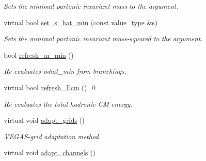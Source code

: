 \begin{DoxyCompactItemize}
\begin{DoxyCompactList}\small\item\em Sets the minimal partonic invariant mass to the argument. \end{DoxyCompactList}\item 
\hypertarget{a00308_a267936bf3ad30578dd484ed9f6330edc}{}virtual bool \hyperlink{a00308_a267936bf3ad30578dd484ed9f6330edc}{set\+\_\+s\+\_\+hat\+\_\+min} (const value\+\_\+type \&\hyperlink{a00308_ae2984255cbdaabc293b8168d93c767bf}{s})\label{a00308_a267936bf3ad30578dd484ed9f6330edc}

\begin{DoxyCompactList}\small\item\em Sets the minimal partonic invariant mass-\/squared to the argument. \end{DoxyCompactList}\item 
\hypertarget{a00308_a2b22b0c269c6f0e27fe6102276de1427}{}bool \hyperlink{a00308_a2b22b0c269c6f0e27fe6102276de1427}{refresh\+\_\+m\+\_\+min} ()\label{a00308_a2b22b0c269c6f0e27fe6102276de1427}

\begin{DoxyCompactList}\small\item\em Re-\/evaluates mhat\+\_\+min from branchings. \end{DoxyCompactList}\item 
\hypertarget{a00308_af24282fe342f982ca26a28d2496cb653}{}virtual bool \hyperlink{a00308_af24282fe342f982ca26a28d2496cb653}{refresh\+\_\+\+Ecm} ()=0\label{a00308_af24282fe342f982ca26a28d2496cb653}

\begin{DoxyCompactList}\small\item\em Re-\/evaluates the total hadronic C\+M-\/energy. \end{DoxyCompactList}\item 
\hypertarget{a00308_ac172aa22fc7caedb79a7cb377bef3031}{}virtual void \hyperlink{a00308_ac172aa22fc7caedb79a7cb377bef3031}{adapt\+\_\+grids} ()\label{a00308_ac172aa22fc7caedb79a7cb377bef3031}

\begin{DoxyCompactList}\small\item\em V\+E\+G\+A\+S-\/grid adaptation method. \end{DoxyCompactList}\item 
\hypertarget{a00308_a183e6b645115376f56ac2c6dfb129872}{}virtual void \hyperlink{a00308_a183e6b645115376f56ac2c6dfb129872}{adapt\+\_\+channels} ()\label{a00308_a183e6b645115376f56ac2c6dfb129872}


\end{DoxyCompactItemize}

